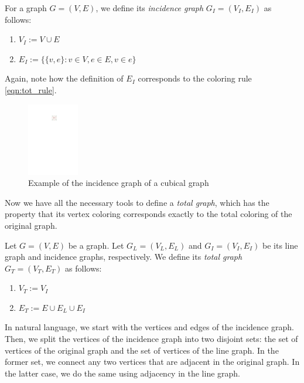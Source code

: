 \begin{defn}
    For a graph $G = (V, E)$, we define its \emph{incidence graph} $G_I = (V_I, E_I)$ as follows:
    \begin{enumerate}
        \item $V_I := V \cup E$
        \item $E_I := \{ \{v, e\} : v \in V, e \in E, v \in e \}$
    \end{enumerate}
\end{defn}

Again, note how the definition of $E_I$ corresponds to the coloring rule \ref{eqn:tot_rule}.

\begin{figure}[H]
    \centering
    \includegraphics[width=0.2\textwidth]{../Resources/Figs/cubical_incid_graph.pdf}
    \caption{Example of the incidence graph of a cubical graph}
    \label{fig:cubical_incid_graph}
\end{figure}

Now we have all the necessary tools to define a \textit{total graph}, which has the property that its vertex coloring corresponds exactly to the total coloring of the original graph.

\begin{defn}
    Let $G = (V, E)$ be a graph. Let $G_L = (V_L, E_L)$ and $G_I = (V_I, E_I)$ be its line graph and incidence graphs, respectively. We define its \emph{total graph} $G_T = (V_T, E_T)$ as follows:
    \begin{enumerate}
        \item $V_T := V_I$
        \item $E_T := E \cup E_L \cup E_I$
    \end{enumerate}
\end{defn}

In natural language, we start with the vertices and edges of the incidence graph. Then, we split the vertices of the incidence graph into two disjoint sets: the set of vertices of the original graph and the set of vertices of the line graph. In the former set, we connect any two vertices that are adjacent in the original graph. In the latter case, we do the same using adjacency in the line graph.

